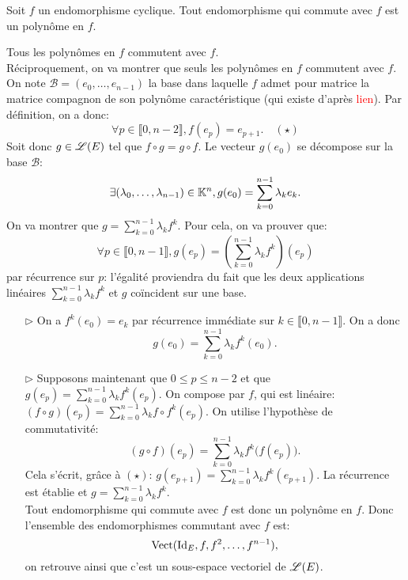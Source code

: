 \begin{prop}{}
    Soit $f$ un endomorphisme cyclique. Tout endomorphisme qui commute avec $f$ est un polynôme en $f$.
\end{prop}

\begin{preuve}
    Tous les polynômes en $f$ commutent avec $f$. \\
    Réciproquement, on va montrer que seuls les polynômes en $f$ commutent avec $f$. On note $\mathscr{B} = (e_0, \dots, e_{n-1})$ la base dans laquelle $f$ admet pour matrice la matrice compagnon de son polynôme caractéristique (qui existe d'après \textcolor{red}{lien}). Par définition, on a donc:
    $$\forall p \in \llbracket 0, n-2 \rrbracket, f(e_p) = e_{p+1}. \quad (\star)$$
    Soit donc $g \in \mathscr{L}(E)$ tel que $f \circ g = g \circ f$. Le vecteur $g(e_0)$ se décompose sur la base $\mathscr{B}$:
    $$\exists (\lambda_0, \dots, \lambda_{n-1}) \in \mathbb{K}^n, g(e_0) = \sum_{k=0}^{n-1} \lambda_k e_k.$$
    On va montrer que $g = \sum\limits_{k=0}^{n-1} \lambda_k f^k$. Pour cela, on va prouver que:
    $$\forall p \in \llbracket 0, n-1 \rrbracket, g(e_p) = \left( \sum_{k=0}^{n-1} \lambda_k f^k \right)(e_p)$$
    par récurrence sur $p$: l'égalité proviendra du fait que les deux applications linéaires $\sum\limits_{k=0}^{n-1} \lambda_k f^k$ et $g$ coïncident sur une base. 
    \begin{itemize}
        \item[$\rhd$] On a $f^k (e_0) = e_k$ par récurrence immédiate sur $k \in \llbracket 0, n-1 \rrbracket$. On a donc
        $$g(e_0) = \sum_{k=0}^{n-1} \lambda_k f^k(e_0).$$
        \item[$\rhd$] Supposons maintenant que $0 \leqslant p \leqslant n-2$ et que $g(e_p) = \sum\limits_{k=0}^{n-1} \lambda_k f^k (e_p)$. On compose par $f$, qui est linéaire: $(f \circ g)(e_p) = \sum\limits_{k=0}^{n-1} \lambda_k f \circ f^k (e_p)$. On utilise l'hypothèse de commutativité:
        $$(g \circ f)(e_p) = \sum_{k=0}^{n-1} \lambda_k f^k \big( f(e_p) \big).$$
        Cela s'écrit, grâce à $(\star)$: $g(e_{p+1}) = \sum\limits_{k=0}^{n-1} \lambda_k f^k(e_{p+1})$. La récurrence est établie et $g = \sum\limits_{k=0}^{n-1} \lambda_k f^k$. \\
        Tout endomorphisme qui commute avec $f$ est donc un polynôme en $f$. Donc l'ensemble des endomorphismes commutant avec $f$ est:
        $$\mathrm{Vect}( \mathrm{Id}_E, f, f^2, \dots, f^{n-1}),$$
        on retrouve ainsi que c'est un sous-espace vectoriel de $\mathscr{L}(E)$.
    \end{itemize}
\end{preuve}


